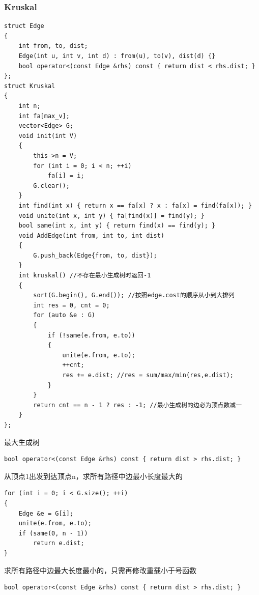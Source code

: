 \documentclass[twoside]{article}
\begin{document}
\subsubsection{Kruskal}
\begin{lstlisting}
struct Edge
{
    int from, to, dist;
    Edge(int u, int v, int d) : from(u), to(v), dist(d) {}
    bool operator<(const Edge &rhs) const { return dist < rhs.dist; }
};
struct Kruskal
{
    int n;
    int fa[max_v];
    vector<Edge> G;
    void init(int V)
    {
        this->n = V;
        for (int i = 0; i < n; ++i)
            fa[i] = i;
        G.clear();
    }
    int find(int x) { return x == fa[x] ? x : fa[x] = find(fa[x]); }
    void unite(int x, int y) { fa[find(x)] = find(y); }
    bool same(int x, int y) { return find(x) == find(y); }
    void AddEdge(int from, int to, int dist)
    {
        G.push_back(Edge{from, to, dist});
    }
    int kruskal() //不存在最小生成树时返回-1
    {
        sort(G.begin(), G.end()); //按照edge.cost的顺序从小到大排列
        int res = 0, cnt = 0;
        for (auto &e : G)
        {
            if (!same(e.from, e.to))
            {
                unite(e.from, e.to);
                ++cnt;
                res += e.dist; //res = sum/max/min(res,e.dist);
            }
        }
        return cnt == n - 1 ? res : -1; //最小生成树的边必为顶点数减一
    }
};
\end{lstlisting}
最大生成树
\begin{lstlisting}
bool operator<(const Edge &rhs) const { return dist > rhs.dist; }
\end{lstlisting}
从顶点1出发到达顶点n，求所有路径中边最小长度最大的
\begin{lstlisting}
for (int i = 0; i < G.size(); ++i)
{
    Edge &e = G[i];
    unite(e.from, e.to);
    if (same(0, n - 1))
        return e.dist;
}
\end{lstlisting}
求所有路径中边最大长度最小的，只需再修改重载小于号函数
\begin{lstlisting}
bool operator<(const Edge &rhs) const { return dist > rhs.dist; }
\end{lstlisting}
\end{document}
